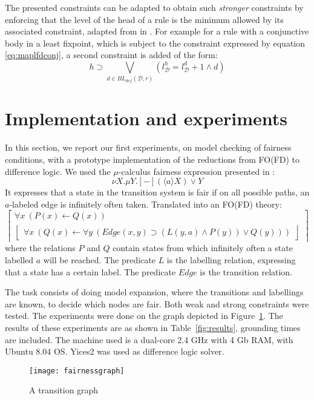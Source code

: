 \documentclass{tlp}
\newcommand{\rul}{\leftarrow}
\newcommand{\lev}[2]{\ensuremath{l_{#1}^{#2}}}
\newcommand{\defset}[2]{BL_{def}(#1, #2)}
\newcommand{\lfd}[1]{\ensuremath{\left \lfloor \begin{array}{l}#1\end{array} \right \rfloor }}
\newcommand{\gfd}[1]{\ensuremath{\left \lceil \begin{array}{l}#1\end{array} \right \rceil}}
\newcommand{\FD}{\ensuremath{\mathcal{D}}\xspace}
\begin{document}
The presented constraints can be adapted to obtain such \emph{stronger} constraints by enforcing that the level of the head of a rule is the minimum allowed by its associated constraint, adapted from in \cite{lpnmr/JanhunenNS09,amai/Niemela08}. For example for a rule with a conjunctive body in a least fixpoint, which is subject to the constraint expressed by equation \ref{eq:maplfdconj}, a second constraint is added of the form:
\begin{equation}
h \supset \bigvee_{d \in \defset{\FD}{r}} (\lev{\FD}{h}= \lev{\FD}{d}+1 \land d)
\end{equation}


\section{Implementation and experiments}\label{sec:exper}
In this section, we report our first experiments, on model checking of fairness conditions, with a prototype implementation of the reductions from FO(FD) to difference logic. We used the $\mu$-calculus fairness expression presented in \cite{tacas/LiuRS98}:
\begin{equation}
\nu X. \mu Y.[-](\langle a \rangle X) \lor Y
\end{equation}
It expresses that a state in the transition system is fair if on all possible paths, an $a$-labeled edge is infinitely often taken. Translated into an FO(FD) theory:
\[
\gfd{ \forall x\ (P(x) \rul Q(x))\\
	\lfd{ \forall x\ (Q(x) \rul \forall y \ (Edge(x, y) \supset (L(y, a) \land P(y)) \lor Q(y)))
	}
}
\]
where the relations $P$ and $Q$ contain states from which infinitely often a state labelled $a$ will be reached. The predicate $L$ is the labelling relation, expressing that a state has a certain label. The predicate $Edge$ is the transition relation.

The task consists of doing model expansion, where the transitions and labellings are known, to decide which nodes are fair. Both weak and strong constraints were tested. The experiments were done on the graph depicted in Figure~\ref{fig:transitiongraph}. The results of these experiments are as shown in Table~\ref{fig:results}, grounding times are included. The machine used is a dual-core 2.4 GHz with 4 Gb RAM, with Ubuntu 8.04 OS. Yices2 was used as difference logic solver.

\begin{figure}
	\centering
	\texttt{[image: fairnessgraph]}
	\caption{A transition graph}
	\label{fig:transitiongraph}
\end{figure}
\end{document}
